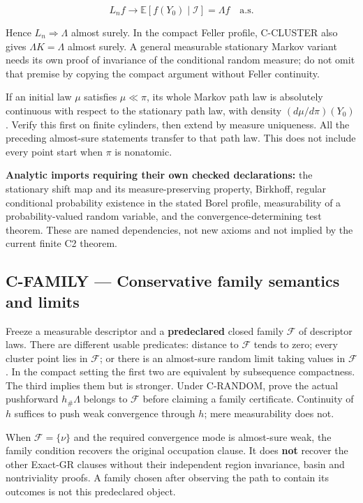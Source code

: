 \documentclass[
  11pt,
  a4paper,
]{article}
\begin{document}
\[L_n f\longrightarrow\mathbb E[f(Y_0)\mid\mathcal I]=\Lambda f\quad\text{a.s.}\]

Hence \(L_n\Rightarrow\Lambda\) almost surely. In the compact Feller
profile, C-CLUSTER also gives \(\Lambda K=\Lambda\) almost surely. A
general measurable stationary Markov variant needs its own proof of
invariance of the conditional random measure; do not omit that premise
by copying the compact argument without Feller continuity.

If an initial law \(\mu\) satisfies \(\mu\ll\pi\), its whole Markov path
law is absolutely continuous with respect to the stationary path law,
with density \((d\mu/d\pi)(Y_0)\). Verify this first on finite
cylinders, then extend by measure uniqueness. All the preceding
almost-sure statements transfer to that path law. This does not include
every point start when \(\pi\) is nonatomic.

\textbf{Analytic imports requiring their own checked declarations:} the
stationary shift map and its measure-preserving property, Birkhoff,
regular conditional probability existence in the stated Borel profile,
measurability of a probability-valued random variable, and the
convergence-determining test theorem. These are named dependencies, not
new axioms and not implied by the current finite C2 theorem.

\subsection{C-FAMILY --- Conservative family semantics and
limits}\label{c-family-conservative-family-semantics-and-limits}

Freeze a measurable descriptor and a \textbf{predeclared} closed family
\(\mathcal F\) of descriptor laws. There are different usable
predicates: distance to \(\mathcal F\) tends to zero; every cluster
point lies in \(\mathcal F\); or there is an almost-sure random limit
taking values in \(\mathcal F\). In the compact setting the first two
are equivalent by subsequence compactness. The third implies them but is
stronger. Under C-RANDOM, prove the actual pushforward \(h_\#\Lambda\)
belongs to \(\mathcal F\) before claiming a family certificate.
Continuity of \(h\) suffices to push weak convergence through \(h\);
mere measurability does not.

When \(\mathcal F=\{\nu\}\) and the required convergence mode is
almost-sure weak, the family condition recovers the original occupation
clause. It does \textbf{not} recover the other Exact-GR clauses without
their independent region invariance, basin and nontriviality proofs. A
family chosen after observing the path to contain its outcomes is not
this predeclared object.
\end{document}
